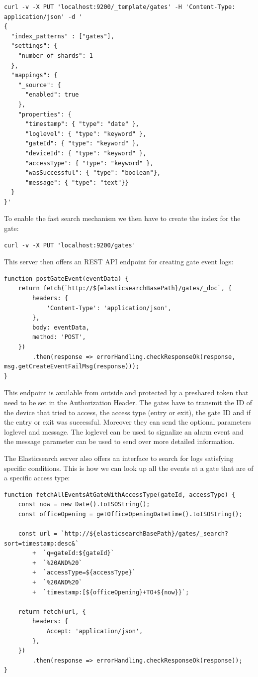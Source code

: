 \begin{lstlisting}[label=curlScriptTemplateElastic]
curl -v -X PUT 'localhost:9200/_template/gates' -H 'Content-Type: application/json' -d '
{
  "index_patterns" : ["gates"],
  "settings": {
    "number_of_shards": 1
  },
  "mappings": {
    "_source": {
      "enabled": true
    },
    "properties": {
      "timestamp": { "type": "date" },
      "loglevel": { "type": "keyword" },
      "gateId": { "type": "keyword" },
      "deviceId": { "type": "keyword" },
      "accessType": { "type": "keyword" },
      "wasSuccessful": { "type": "boolean"},
      "message": { "type": "text"}}
  }
}'
\end{lstlisting}

To enable the fast search mechanism we then have to create the index for the gate:

\begin{lstlisting}[label=curlScriptElastic]
curl -v -X PUT 'localhost:9200/gates'
\end{lstlisting}

This server then offers an REST API endpoint for creating gate event logs:
\begin{lstlisting}[label=searchElasticPOST]
function postGateEvent(eventData) {
    return fetch(`http://${elasticsearchBasePath}/gates/_doc`, {
        headers: {
            'Content-Type': 'application/json',
        },
        body: eventData,
        method: 'POST',
    })
        .then(response => errorHandling.checkResponseOk(response, msg.getCreateEventFailMsg(response)));
}
\end{lstlisting}

This endpoint is available from outside and protected by a preshared token that need to be set in the Authorization Header. The gates have to transmit the ID of the device that tried to access, the access type (entry or exit), the gate ID and if the entry or exit was successful. Moreover they can send the optional parameters loglevel and message. The loglevel can be used to signalize an alarm event and the message parameter can be used to send over more detailed information.

The Elasticsearch server also offers an interface to search for logs satisfying specific conditions. This is how we can look up all the events at a gate that are of a specific access type:

\begin{lstlisting}[label=searchElasticGET]
function fetchAllEventsAtGateWithAccessType(gateId, accessType) {
    const now = new Date().toISOString();
    const officeOpening = getOfficeOpeningDatetime().toISOString();

    const url = `http://${elasticsearchBasePath}/gates/_search?sort=timestamp:desc&`
        +  `q=gateId:${gateId}`
        +  `%20AND%20`
        +  `accessType=${accessType}`
        +  `%20AND%20`
        +  `timestamp:[${officeOpening}+TO+${now}}`;
        
    return fetch(url, {
        headers: {
            Accept: 'application/json',
        },
    })
        .then(response => errorHandling.checkResponseOk(response));
}
\end{lstlisting}

